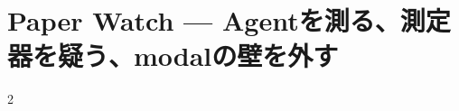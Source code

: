 \documentclass[lualatex,a4paper,11pt]{jlreq}
\begin{document}
\Needspace{0.42\textheight}
\bigskip
\section{Paper Watch — Agentを測る、測定器を疑う、modalの壁を外す}
\label{pkg:paper-watch-may}
\vspace{0.15em}
\begin{multicols}{2}

\end{multicols}


\Needspace{0.40\textheight}
\bigskip

\bigskip
\printbibliography[title={References / Source Notes}]
\end{document}
